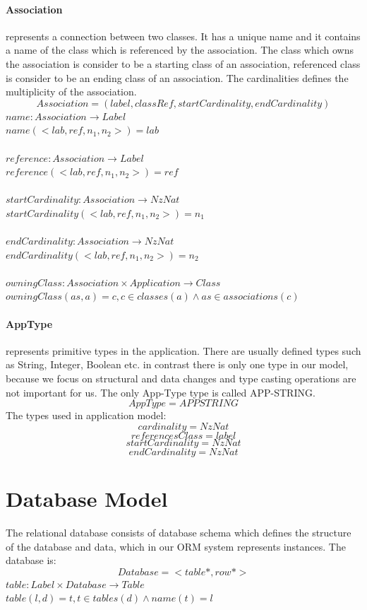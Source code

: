 \documentclass[11pt]{article}
\begin{document}
\paragraph {Association} represents a connection between two classes. It has a unique name and it contains a name of the class which is referenced by the association. The class which owns the association is consider to be a starting class of an association, referenced class is consider to be an ending class of an association. The cardinalities defines the multiplicity of the association.
$$
Association = (label, classRef, startCardinality, endCardinality)
$$
$name : Association \rightarrow Label$ \\
$name(< lab, ref, n_1, n_2  >) = lab$\\ \\
$reference : Association \rightarrow Label$ \\
$reference(< lab, ref, n_1, n_2  >) = ref$\\ \\
$startCardinality : Association \rightarrow NzNat$ \\
$startCardinality(< lab, ref, n_1, n_2  >) = n_1$\\ \\
$endCardinality : Association \rightarrow NzNat$ \\
$endCardinality(< lab, ref, n_1, n_2  >) = n_2$ \\ \\
$owningClass : Association \times Application \rightarrow Class $ \\
$owningClass(as, a) = c, c \in classes(a) \wedge as \in associations(c) $

\paragraph{AppType} represents primitive types in the application. There are usually defined types such as String, Integer, Boolean etc. in contrast there is only one type in our model, because we focus on structural and data changes and type casting operations are not important for us. The only App-Type type is called APP-STRING.
$$
AppType = APPSTRING
$$
The types used in application model:
$$
cardinality = NzNat
$$
$$
referencesClass = label
$$
$$
startCardinality = NzNat
$$
$$
endCardinality = NzNat
$$


\section{Database Model}
\label{sec:dbModel}
The relational database consists of database schema which defines the structure of the database and data, which in our ORM system represents instances. The database is:
$$
Database = <table*, row*>
$$
$table : Label \times Database \rightarrow Table $ \\
$table(l, d) = t, t \in tables(d) \wedge name(t) = l$ \\
\end{document}

